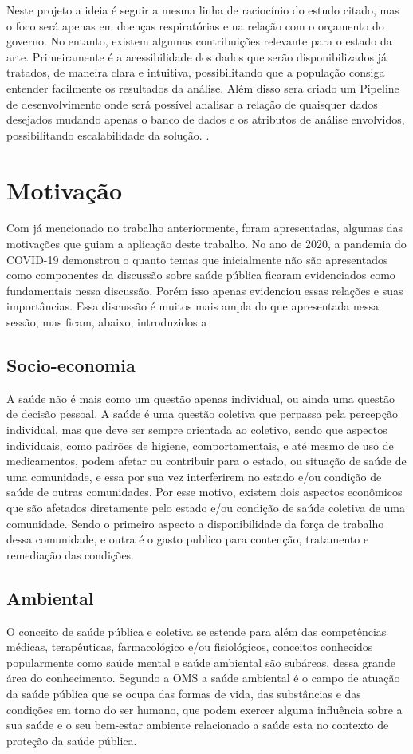 \documentclass[journal]{IEEEtran}
\begin{document}
Neste projeto a ideia é seguir a mesma linha de raciocínio do estudo citado, mas o foco será apenas em doenças respiratórias e na relação com o orçamento do governo. No entanto, existem algumas contribuições relevante para o estado da arte. Primeiramente é a acessibilidade dos dados que serão disponibilizados já tratados, de maneira clara e intuitiva, possibilitando que a população consiga entender facilmente os resultados da análise. Além disso sera criado um Pipeline de desenvolvimento onde será possível analisar a relação de quaisquer dados desejados mudando apenas o banco de dados e os atributos de análise envolvidos, possibilitando escalabilidade da solução.  \cite{mudanças}.

\section{Motivação} 
Com já mencionado no trabalho anteriormente, foram apresentadas, algumas das motivações que guiam a aplicação deste trabalho. 
No ano de 2020, a pandemia do COVID-19 demonstrou o quanto temas que inicialmente não são apresentados como componentes da discussão sobre saúde pública ficaram evidenciados como fundamentais nessa discussão. Porém isso apenas evidenciou essas relações e suas importâncias. Essa discussão é muitos mais ampla do que apresentada nessa sessão, mas ficam, abaixo, introduzidos a
\subsection{Socio-economia}
A saúde não é mais como um questão apenas individual, ou ainda uma questão de decisão pessoal. A saúde é uma questão coletiva \cite{saude_coletiva} que perpassa pela percepção individual, mas que deve ser sempre orientada ao coletivo, sendo que aspectos individuais, como padrões de higiene, comportamentais, e até mesmo de uso de medicamentos, podem afetar ou contribuir para o estado, ou situação de saúde de uma comunidade, e essa por sua vez interferirem no estado e/ou condição de saúde de outras comunidades.
Por esse motivo, existem dois aspectos econômicos \cite{saude_forca_trabalho} que são afetados diretamente pelo estado e/ou condição de saúde coletiva de uma comunidade. Sendo o primeiro aspecto a disponibilidade da força de trabalho dessa comunidade, e outra é o gasto publico para contenção, tratamento e remediação das condições.
\subsection{Ambiental}
O conceito de saúde pública e coletiva se estende para além das competências médicas, terapêuticas, farmacológico e/ou fisiológicos, conceitos conhecidos popularmente como saúde mental e saúde ambiental são subáreas, dessa grande área do conhecimento.
Segundo a OMS a saúde ambiental é o campo de atuação da saúde pública que se ocupa das formas de vida, das substâncias e das condições em torno do ser humano, que podem exercer alguma influência sobre a sua saúde e o seu bem-estar \cite{ms_oms} ambiente relacionado a saúde esta no contexto de proteção da saúde pública. 
\end{document}
